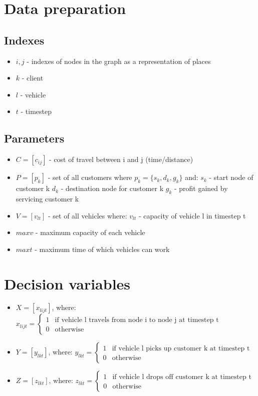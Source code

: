 \documentclass{article}
\begin{document}
\section{Data preparation}
\subsection{Indexes}
\begin{itemize}
    \item $i, j$ - indexes of nodes in the graph as a representation of places
    \item $k$ - client
    \item $l$ - vehicle
    \item $t$ - timestep
\end{itemize}

\subsection{Parameters}
\begin{itemize}
    \item$C=[c_{ij}]$ - cost of travel between i and j (time/distance)
    \item$P=[p_k]$ - set of all customers where $p_k=\{s_k, d_k, g_k\}$ and:
        \subitem$s_k$ - start node of customer k
        \subitem$d_k$ - destination node for customer k
        \subitem$g_k$ - profit gained by servicing customer k
    \item$V=[v_{lt}]$ - set of all vehicles where:
        \subitem$v_{lt}$ - capacity of vehicle l in timestep t
    \item$maxv$ - maximum capacity of each vehicle
    \item$maxt$ - maximum time of which vehicles can work
\end{itemize}

\section{Decision variables}
\begin{itemize}
    \item$X=[x_{lijt}]$, where:
        \( x_{lijt} =
        \begin{cases}
        1 & \text{if vehicle l travels from node i to node j at timestep t}\\
        0 & \text{otherwise}
        \end{cases}
        \)
    \item$Y=[y_{lkt}]$, where:
        \( y_{lkt} =
        \begin{cases}
        1 & \text{if vehicle l picks up customer k at timestep t}\\
        0 & \text{otherwise}
        \end{cases}
        \)
    \item$Z=[z_{lkt}]$, where:
        \( z_{lkt} =
        \begin{cases}
        1 & \text{if vehicle l drops off customer k at timestep t}\\
        0 & \text{otherwise}
        \end{cases}
        \)
\end{itemize}
\end{document}
